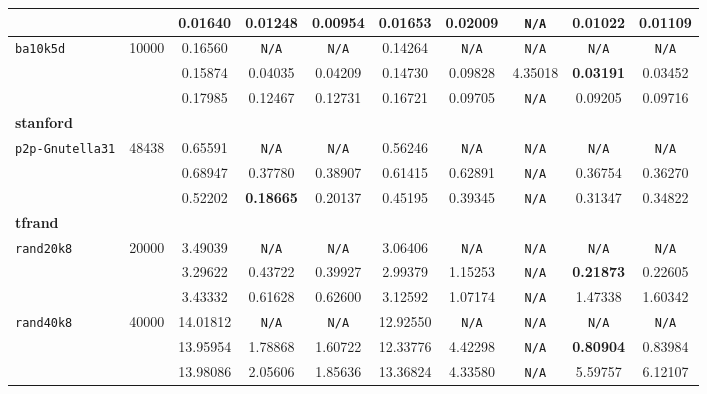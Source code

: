 {\begin{tabular}{ l | c c c c c c c c c }
\verb| | &  & 0.01640 & 0.01248 & \textbf{0.00954} & 0.01653 & 0.02009 & \verb|N/A| & 0.01022 & 0.01109 \\
\hline
\verb|ba10k5d| & 10000 & 0.16560 & \verb|N/A| & \verb|N/A| & 0.14264 & \verb|N/A| & \verb|N/A| & \verb|N/A| & \verb|N/A| \\
\verb| | &  & 0.15874 & 0.04035 & 0.04209 & 0.14730 & 0.09828 & 4.35018 & \textbf{0.03191} & 0.03452 \\
\verb| | &  & 0.17985 & 0.12467 & 0.12731 & 0.16721 & 0.09705 & \verb|N/A| & 0.09205 & 0.09716 \\
\hline
\multicolumn{10}{l}{\textbf{stanford}} \\
\hline
\verb|p2p-Gnutella31| & 48438 & 0.65591 & \verb|N/A| & \verb|N/A| & 0.56246 & \verb|N/A| & \verb|N/A| & \verb|N/A| & \verb|N/A| \\
\verb| | &  & 0.68947 & 0.37780 & 0.38907 & 0.61415 & 0.62891 & \verb|N/A| & 0.36754 & 0.36270 \\
\verb| | &  & 0.52202 & \textbf{0.18665} & 0.20137 & 0.45195 & 0.39345 & \verb|N/A| & 0.31347 & 0.34822 \\
\hline
\multicolumn{10}{l}{\textbf{tfrand}} \\
\hline
\verb|rand20k8| & 20000 & 3.49039 & \verb|N/A| & \verb|N/A| & 3.06406 & \verb|N/A| & \verb|N/A| & \verb|N/A| & \verb|N/A| \\
\verb| | &  & 3.29622 & 0.43722 & 0.39927 & 2.99379 & 1.15253 & \verb|N/A| & \textbf{0.21873} & 0.22605 \\
\verb| | &  & 3.43332 & 0.61628 & 0.62600 & 3.12592 & 1.07174 & \verb|N/A| & 1.47338 & 1.60342 \\
\hline
\verb|rand40k8| & 40000 & 14.01812 & \verb|N/A| & \verb|N/A| & 12.92550 & \verb|N/A| & \verb|N/A| & \verb|N/A| & \verb|N/A| \\
\verb| | &  & 13.95954 & 1.78868 & 1.60722 & 12.33776 & 4.42298 & \verb|N/A| & \textbf{0.80904} & 0.83984 \\
\verb| | &  & 13.98086 & 2.05606 & 1.85636 & 13.36824 & 4.33580 & \verb|N/A| & 5.59757 & 6.12107 \\
\hline
  \end{tabular}
}

